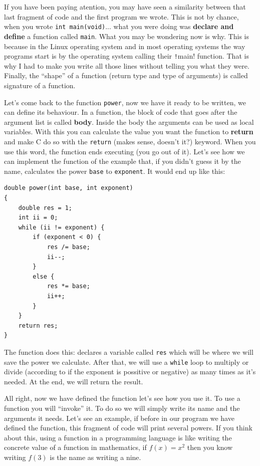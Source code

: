 \documentclass[a4paper]{article}
\begin{document}
If you have been paying atention, you may have seen a similarity between that
last fragment of code and the first program we wrote. This is not by chance,
when you wrote \verb!int main(void)!... what you were doing was \textbf{declare
and define} a function called \verb!main!. What you may be wondering now is why.
This is because in the Linux operating system and in most operating systems
the way programs start is by the operating system calling their \texttt!main!
function. That is why I had to make you write all those lines without telling
you what they were. Finally, the ``shape'' of a function (return type and
type of arguments) is called signature of a function.

Let's come back to the function \verb!power!, now we have it ready to be written,
we can define its behaviour. In a function, the block of code that goes after
the argument list is called \textbf{body}. Inside the body the arguments can
be used as local variables. With this you can calculate the value you want the
function to \textbf{return} and make C do so with the
\lstinline[style=C]{return} (makes sense, doesn't it?) keyword.
When you use this word, the function ends executing (you go out of it).
Let's see how we can implement the function of the example that, if you
didn't guess it by the name, calculates
the power \verb!base! to \verb!exponent!. It would end up like this:

\noindent
\begin{minipage}[H]{\linewidth}
\mbox{}
\begin{lstlisting}[style=C, label={lst:functionExample},
caption={Example of a function in C}]
double power(int base, int exponent)
{
    double res = 1;
    int ii = 0;
    while (ii != exponent) {
        if (exponent < 0) {
            res /= base;
            ii--;
        }
        else {
            res *= base;
            ii++;
        }
    }
    return res;
}
\end{lstlisting}
\end{minipage}

The function does this: declares a variable called \verb!res! which will be
where we will save the power we calculate. After that, we will use a
\verb!while! loop to multiply or divide (according to if the exponent is
possitive or negative) as many times as it's needed. At the end, we will return
the result.

All right, now we have defined the function let's see how you use it. To use
a function you will ``invoke'' it. To do so we will simply write its name and
the arguments it needs. Let's see an example, if before in our program we
have defined the function, this fragment of code will print several powers.
If you think about this, using a function in a programming language is like
writing the concrete value of a function in mathematics, if $f(x) = x^2$
then you know writing $f(3)$ is the name as writing a nine.
\end{document}
